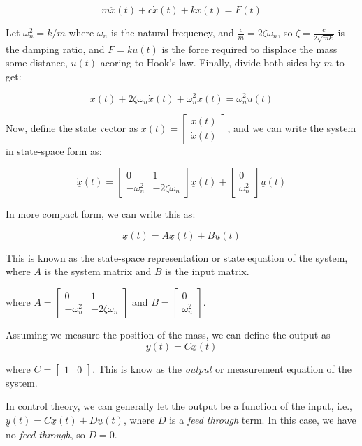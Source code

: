 \documentclass[
  letterpaper,
  DIV=11,
  numbers=noendperiod]{scrreprt}
\begin{document}
\[ m\ddot{x}(t) + c\dot{x}(t) + kx(t) = F(t)\]

Let \(\omega_n^2 = {k/m}\) where \(\omega_n\) is the natural frequency,
and \(\frac{c}{m} = 2\zeta\omega_n\), so
\(\zeta = \frac{c}{2\sqrt{mk}}\) is the damping ratio, and \(F=k u(t)\)
is the force required to displace the mass some distance, \(u(t)\)
acoring to Hook's law. Finally, divide both sides by \(m\) to get:

\[ \ddot{x}(t) + 2\zeta\omega_n \dot{x}(t) + \omega_n^2 x(t) = \omega_n^2 u(t) \]

Now, define the state vector as
\(\underline{x}(t) = \begin{bmatrix} x(t) \\ \dot{x}(t) \end{bmatrix}\),
and we can write the system in state-space form as:

\[ \dot{\underline{x}}(t) = \begin{bmatrix} 0 & 1 \\ -\omega_n^2 & -2\zeta\omega_n \end{bmatrix} \underline{x}(t) + \begin{bmatrix} 0 \\ \omega_n^2 \end{bmatrix} \underline{u}(t) \]

In more compact form, we can write this as:

\[ \dot{\underline{x}}(t) = A\underline{x}(t) + B \underline{u}(t) \]

This is known as the state-space representation or state equation of the
system, where \(A\) is the system matrix and \(B\) is the input matrix.

where
\(A = \begin{bmatrix} 0 & 1 \\ -\omega_n^2 & -2\zeta\omega_n \end{bmatrix}\)
and \(B = \begin{bmatrix} 0 \\ \omega_n^2 \end{bmatrix}\).

Assuming we measure the position of the mass, we can define the output
as \[y(t) = C\underline{x}(t)\]

where \(C = \begin{bmatrix} 1 & 0 \end{bmatrix}\). This is know as the
\emph{output} or measurement equation of the system.

In control theory, we can generally let the output be a function of the
input, i.e.,
\(\underline{y}(t) = C\underline{x}(t) + D\underline{u}(t)\), where
\(D\) is a \emph{feed through} term. In this case, we have no \emph{feed
through}, so \(D=0\).
\end{document}
